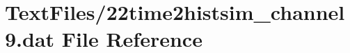 \hypertarget{22time2histsim__channel9_8dat}{}\section{Text\+Files/22time2histsim\+\_\+channel9.dat File Reference}
\label{22time2histsim__channel9_8dat}
